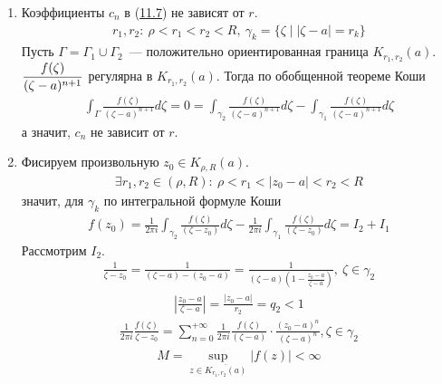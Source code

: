 \pr
\begin{enumerate}
    \item Коэффициенты $c_n$ в (\href{(11.7)}{11.7}) не зависят от $r$.
    \begin{align*}
      r_1,r_2: \ \rho < r_1 < r_2 < R, \ \gamma_k = \{\zeta \mid \left| \zeta - a \right| = r_k\}
    \end{align*}
    Пусть $\Gamma = \Gamma_1 \cup \Gamma_2$~--- положительно ориентированная
    граница $K_{r_1,r_2}(a)$.
    \\
    $\displaystyle \frac{f(\zeta)}{(\zeta - a)^{n+1}}$ регулярна в $K_{r_1,r_2}(a)$.
    Тогда по обобщенной теореме Коши
    \begin{align*}
      \int_{\Gamma} \frac{f(\zeta)}{(\zeta - a)^{n+1}}d\zeta = 0 = \int_{\gamma_2} \frac{f(\zeta)}{(\zeta - a)^{n+1}}d\zeta - \int_{\gamma_1} \frac{f(\zeta)}{(\zeta - a)^{n+1}}d\zeta
    \end{align*}
    а значит, $c_n$ не зависит от $r$.
    \item Фисируем произвольную $z_0 \in K_{\rho,R}(a)$.
    \begin{align*}
      \exists r_1, r_2 \in (\rho,R): \ \rho < r_1 < \left| z_0-a \right|<r_2<R 
    \end{align*}
    значит, для $\gamma_k$ по интегральной формуле Коши
    \begin{align*}
      f(z_0) = \frac{1}{2\pi i}\int_{\gamma_2} \frac{f(\zeta)}{(\zeta - z_0)}d\zeta - \frac{1}{2\pi i}\int_{\gamma_1} \frac{f(\zeta)}{(\zeta - z_0)}d\zeta = I_2 + I_1
    \end{align*}
    Рассмотрим $I_2$.
    \begin{align*}
      \frac{1}{\zeta - z_0} = \frac{1}{(\zeta - a) - (z_0-a)} = \frac{1}{(\zeta - a)\left( 1 - \frac{z_0-a}{\zeta-a} \right)}, \ \zeta \in \gamma_2
    \end{align*}
    \begin{align*}
      \left| \frac{z_0-a}{\zeta - a} \right| = \frac{\left| z_0-a \right|}{r_2} = q_2 < 1
    \end{align*}
    \begin{align*}
      \frac{1}{2 \pi i}\frac{f(\zeta)}{\zeta - z_0} = \sum_{n=0}^{+\infty}\frac{1}{2\pi i}\frac{f(\zeta)}{(\zeta - a)} \cdot \frac{(z_0-a)^n}{(\zeta - a)^n}, \zeta \in \gamma_2
    \end{align*}
    \begin{align*}
      M = \sup_{z \in \overline{K_{r_1,r_2}(a)}}\left| f(z) \right|< \infty
    \end{align*}

\end{enumerate}

